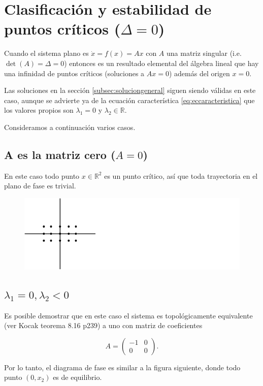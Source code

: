 \documentclass[11pt]{book}
\theoremstyle{definition}
\numberwithin{definition}{section}
\theoremstyle{theorem}
\numberwithin{theorem}{section}
\numberwithin{lemma}{section}
\numberwithin{corollary}{section}
\theoremstyle{plain}
\numberwithin{example}{section}
\newcommand{\R}{{\ensuremath{\mathbb{R}}}}
\begin{document}
\section{Clasificación y estabilidad de puntos críticos ($\Delta = 0$)}

Cuando el sistema plano es $\dot{x} = f(x) = Ax$ con $A$ una matriz singular (i.e. $\det(A) = \Delta = 0$) entonces es un resultado elemental del álgebra lineal que hay una infinidad de puntos críticos (soluciones a $Ax = 0$) además del origen $x = 0$.

Las soluciones en la sección \ref{subsec:soluciongeneral} siguen siendo válidas en este caso, aunque se advierte ya de la ecuación característica \ref{eq:eccaracteristica} que los valores propios son $\lambda_1 = 0$ y $\lambda_2 \in \R$.

Consideramos a continuación varios casos.

\subsection{A es la matriz cero ($A = 0$)}
En este caso todo punto $x \in \R^2$ es un punto crítico, así que toda trayectoria en el plano de fase es trivial.

\begin{figure}[!ht] \centering
    \includegraphics[scale=1.0]{figures/amatriz0.pdf}  
\end{figure}


\subsection{$\lambda_1 = 0, \lambda_2 < 0$}
Es posible demostrar que en este caso el sistema es topológicamente equivalente (ver Kocak teorema 8.16 p239) a uno con matriz de coeficientes

$$ A = \left( \begin{array}{ll} -1 & 0 \\ 0 & 0 \end{array} \right).$$

Por lo tanto, el diagrama de fase es similar a la figura siguiente, donde todo punto $(0,x_2)$ es de equilibrio.
\end{document}
